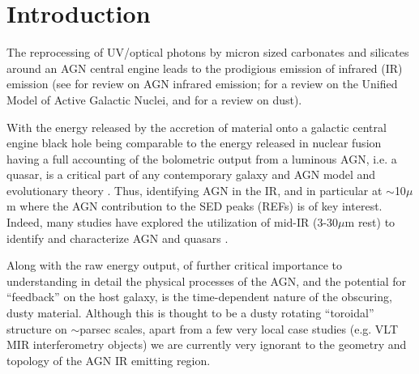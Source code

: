 \documentclass[apj]{emulateapj}
\begin{document}

\maketitle


\section{Introduction}
The reprocessing of UV/optical photons by micron sized carbonates and
silicates around an AGN central engine leads to the prodigious emission
of infrared (IR) emission (see \citet{Elitzur14} for review on AGN infrared
emission; \citet{Netzer15} for a review on the Unified Model of
Active Galactic Nuclei, and \citet[][]{Draine03} for a
review on dust).

With the energy released by the accretion of material onto a galactic
central engine black hole being comparable to the energy released in
nuclear fusion having a full accounting of the bolometric output from
a luminous AGN, i.e. a quasar, is a critical part of any contemporary
galaxy and AGN model and evolutionary theory
\citep[e.g.,][]{Rosas-Guevara2016, Bower2017, McAlpine2017,
Pillepich2017}. Thus, identifying AGN in the IR, and in particular at
$\sim$10$\mu$m where the AGN contribution to the SED peaks (REFs) is
of key interest. Indeed, many studies have explored the utilization of
mid-IR (3-30$\mu$m rest) to identify and characterize AGN and quasars
\citep{Lacy04, Stern05, Martinez-Sansigre06, Richards09b, Donley12,
Stern12, Banerji13, Assef13, Richards15, Timlin16}.

Along with the raw energy output, of further critical importance to
understanding in detail the physical processes of the AGN, and the
potential for ``feedback'' on the host galaxy, is the time-dependent
nature of the obscuring, dusty material. Although this is thought to
be a dusty rotating ``toroidal'' structure on $\sim$parsec scales,
apart from a few very local case studies (e.g. VLT MIR interferometry
objects) we are currently very ignorant to the geometry and topology
of the AGN IR emitting region.
\end{document}
